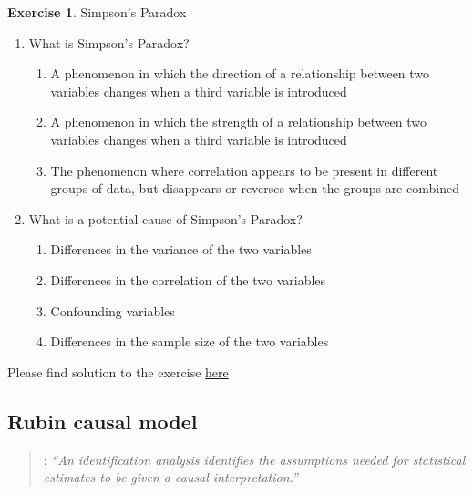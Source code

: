 \documentclass[
  12pt,
  oneside]{book}
\providecommand{\tightlist}{%
  \setlength{\itemsep}{0pt}\setlength{\parskip}{0pt}}
\theoremstyle{definition}
\theoremstyle{definition}
\theoremstyle{definition}
\newtheorem{exercise}{Exercise}[chapter]
\theoremstyle{definition}
\theoremstyle{remark}
\begin{document}
\begin{exercise}
\protect\hypertarget{exr:simpsonpara}{}\label{exr:simpsonpara}Simpson's Paradox

\begin{enumerate}
\def\labelenumi{\arabic{enumi}.}
\tightlist
\item
  What is Simpson's Paradox?

  \begin{enumerate}
  \def\labelenumii{\alph{enumii})}
  \tightlist
  \item
    A phenomenon in which the direction of a relationship between two variables changes when a third variable is introduced
  \item
    A phenomenon in which the strength of a relationship between two variables changes when a third variable is introduced
  \item
    The phenomenon where correlation appears to be present in different groups of data, but disappears or reverses when the groups are combined
  \end{enumerate}
\item
  What is a potential cause of Simpson's Paradox?

  \begin{enumerate}
  \def\labelenumii{\alph{enumii})}
  \tightlist
  \item
    Differences in the variance of the two variables
  \item
    Differences in the correlation of the two variables
  \item
    Confounding variables
  \item
    Differences in the sample size of the two variables
  \end{enumerate}
\end{enumerate}

Please find solution to the exercise \protect\hyperlink{sol:simpsonpara}{here}
\end{exercise}

\hypertarget{rubin-causal-model}{%
\subsection{Rubin causal model}\label{rubin-causal-model}}

\begin{quote}
\citet[page 314]{Keele2015statistics}: \emph{``An identification analysis identifies the assumptions needed for statistical estimates to be given a causal interpretation.''}
\end{quote}
\end{document}
